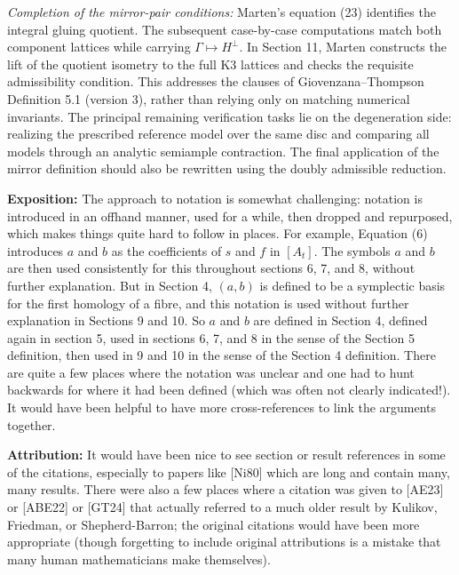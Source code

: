 \documentclass[11pt]{article}
\theoremstyle{definition}
\theoremstyle{remark}
\begin{document}
{\noindent
{\em Completion of the mirror-pair conditions:}
Marten’s equation (23) identifies the integral gluing quotient. The subsequent case-by-case computations match both component lattices while carrying
$\Gamma \longmapsto H^\perp$.
In Section 11, Marten constructs the lift of the quotient isometry to the full K3 lattices and checks the requisite admissibility condition. This addresses the clauses of Giovenzana–Thompson Definition 5.1 (version 3), rather than relying only on matching numerical invariants.
The principal remaining verification tasks lie on the degeneration side: realizing the prescribed reference model over the same disc and comparing all models through an analytic semiample contraction. The final application of the mirror definition should also be rewritten using the doubly admissible reduction. \vspace{.125in}

\noindent
{\bf Exposition:} The approach to notation is somewhat challenging: notation is introduced in an offhand manner, used for a while, then dropped and repurposed, which makes things quite hard to follow in places. For example, Equation (6) introduces $a$ and $b$ as the coefficients of $s$ and $f$ in $[A_t]$. The symbols $a$ and $b$ are then used consistently for this throughout sections 6, 7, and 8, without further explanation. But in Section 4, $(a,b)$ is defined to be a symplectic basis for the first homology of a fibre, and this notation is used without further explanation in Sections 9 and 10. So $a$ and $b$ are defined in Section 4, defined again in section 5, used in sections 6, 7, and 8 in the sense of the Section 5 definition, then used in 9 and 10 in the sense of the Section 4 definition. There are quite a few places where the notation was unclear and one had to hunt backwards for where it had been defined (which was often not clearly indicated!). It would have been helpful to have more cross-references to link the arguments together. \vspace{.125in}

\noindent
{\bf Attribution:} It would have been nice to see section or result references in some of the citations, especially to papers like [Ni80] which are long and contain many, many results. There were also a few places where a citation was given to [AE23] or [ABE22] or [GT24] that actually referred to a much older result by Kulikov, Friedman, or Shepherd-Barron; the original citations would have been more appropriate (though forgetting to include original attributions is a mistake that many human mathematicians make themselves). 

}
\end{document}
